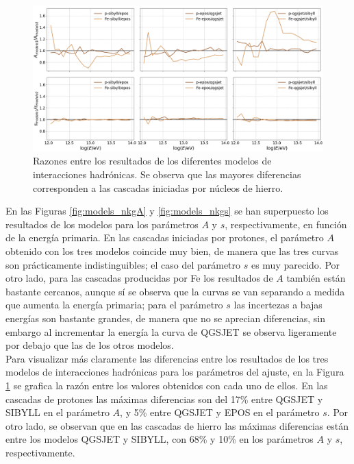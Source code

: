 		\begin{figure} []
		\includegraphics[width=\textwidth]{Figuras/models_ratios}
		\caption{Razones entre los resultados de los diferentes modelos de interacciones hadr\'onicas. Se observa que las mayores diferencias corresponden a las cascadas iniciadas por n\'ucleos de hierro.}
		\label{fig:models_ratios}
		\end{figure}
	
				
	En las Figuras \ref{fig:models_nkgA} y \ref{fig:models_nkgs} se han superpuesto los resultados de los modelos para los par\'ametros $A$ y $s$, respectivamente, en funci\'on de la energ\'ia primaria. En las cascadas iniciadas por protones, el par\'ametro $A$ obtenido con los tres modelos coincide muy bien, de manera que las tres curvas son pr\'acticamente indistinguibles; el caso del par\'ametro $s$ es muy parecido. Por otro lado, para las cascadas producidas por Fe los resultados de $A$ tambi\'en est\'an bastante cercanos, aunque s\'i se observa que la curvas se van separando a medida que aumenta la energ\'ia primaria; para el par\'ametro $s$ las incertezas a bajas energ\'ias son bastante grandes, de manera que no se aprecian diferencias, sin embargo al incrementar la energ\'ia la curva de QGSJET se observa ligeramente por debajo que las de los otros modelos.\\
		
		Para visualizar m\'as claramente las diferencias entre los resultados de los tres modelos de interacciones hadr\'onicas para los par\'ametros del ajuste, en la Figura \ref{fig:models_ratios} se grafica la raz\'on entre los valores obtenidos con cada uno de ellos. En las cascadas de protones las m\'aximas diferencias son del 17\% entre QGSJET y SIBYLL en el par\'ametro $A$, y 5\% entre QGSJET y EPOS en el par\'ametro $s$. Por otro lado, se observan que en las cascadas de hierro las m\'aximas diferencias est\'an entre los modelos QGSJET y SIBYLL, con 68\% y 10\% en los par\'ametros $A$ y $s$, respectivamente.


